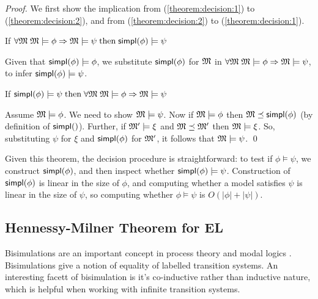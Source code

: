 \begin{proof}
We first show the implication from (\ref{theorem:decision:1}) to
(\ref{theorem:decision:2}), and from (\ref{theorem:decision:2}) to
(\ref{theorem:decision:1}).  \setcounter{mycase}{0}
\begin{mycase}
If $\forall \frak{M} \; \frak{M} \models \phi \Rightarrow \frak{M} \models \psi \; \text{then} \; \mathsf{simpl}(\phi) \models \psi$
\end{mycase}

\NI Given that $\mathsf{simpl}(\phi) \models \phi$, we substitute $\mathsf{simpl}(\phi)$ for $\frak{M} $ in
$\forall \frak{M} \; \frak{M} \models \phi \Rightarrow \frak{M} \models \psi$, to infer $\mathsf{simpl}(\phi)
\models \psi$.

\begin{mycase}
If $\mathsf{simpl}(\phi) \models \psi \; \text{then} \; \forall \frak{M} \; \frak{M} \models \phi \Rightarrow \frak{M} \models \psi$
\end{mycase}

\NI Assume $\frak{M} \models \phi$. We need to show $\frak{M} \models \psi$.  Now if $\frak{M}
\models \phi$ then $\frak{M} \preceq \mathsf{simpl}(\phi)$ (by definition of $\SIMPL$).  Further, if
$\frak{M}' \models \xi $ and $\frak{M} \preceq \frak{M}'$ then $\frak{M} \models \xi $. So, substituting $\psi$
for $\xi $ and $\mathsf{simpl}(\phi)$ for $\frak{M}'$, it follows that $\frak{M} \models \psi$.  \qed
\end{proof}

\NI Given this theorem, the decision procedure is straightforward: to
test if $\phi \models \psi$, we construct $\mathsf{simpl}(\phi)$, and then inspect whether
$\mathsf{simpl}(\phi) \models \psi$.  Construction of $\mathsf{simpl}(\phi)$ is linear in the size of
$\phi$, and computing whether a model satisfies $\psi$ is linear in the size
of $\psi$, so computing whether $\phi \models \psi$ is $O(|\phi|+|\psi|)$.


\subsection{Hennessy-Milner Theorem for EL}

Bisimulations are an important concept in process theory and modal
logics \cite{SangiorgiD:intbisac}. Bisimulations give a notion of
equality of labelled transition systems. An interesting facett of
bisimulation is it's co-inductive rather than inductive nature, which
is helpful when working with infinite transition systems.


